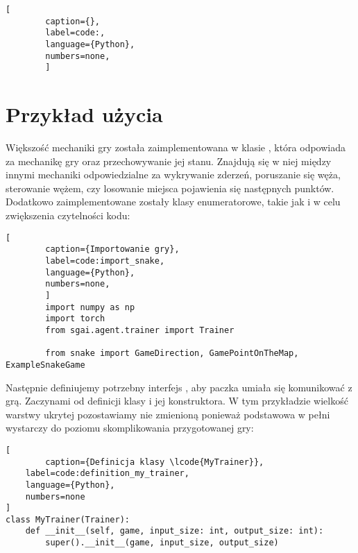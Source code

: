 \begin{onepage}
    \begin{lstlisting}[
        caption={},
        label=code:,
        language={Python},
        numbers=none,
        ]

    \end{lstlisting}
\end{onepage}


\clearpage

\section{Przykład użycia}

Większość mechaniki gry została zaimplementowana w klasie , która odpowiada za mechanikę gry oraz przechowywanie jej stanu. Znajdują się w niej między innymi mechaniki odpowiedzialne za wykrywanie zderzeń, poruszanie się węża, sterowanie wężem, czy losowanie miejsca pojawienia się następnych punktów. Dodatkowo zaimplementowane zostały klasy enumeratorowe, takie jak  i  w celu zwiększenia czytelności kodu:

\begin{onepage}
    \begin{lstlisting}[
        caption={Importowanie gry},
        label=code:import_snake,
        language={Python},
        numbers=none,
        ]
        import numpy as np
        import torch
        from sgai.agent.trainer import Trainer
        
        from snake import GameDirection, GamePointOnTheMap, ExampleSnakeGame
    \end{lstlisting}
\end{onepage}



Następnie definiujemy potrzebny interfejs , aby paczka  umiała się komunikować z grą. Zaczynami od definicji klasy i jej konstruktora. W tym przykładzie wielkość warstwy ukrytej pozostawiamy nie zmienioną ponieważ podstawowa w pełni wystarczy do poziomu skomplikowania przygotowanej gry:

\begin{onepage}
    \begin{lstlisting}[
        caption={Definicja klasy \lcode{MyTrainer}},
    label=code:definition_my_trainer,
    language={Python},
    numbers=none
]
class MyTrainer(Trainer):
    def __init__(self, game, input_size: int, output_size: int):
        super().__init__(game, input_size, output_size)
    \end{lstlisting}
\end{onepage}

